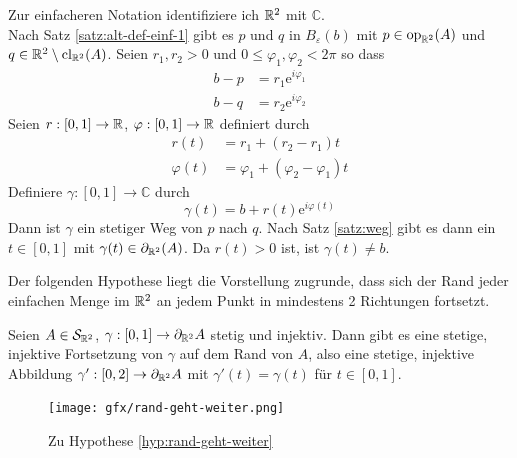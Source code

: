     \begin{bew}
        Zur einfacheren Notation identifiziere ich $\mathbb{R}^2$ mit $\mathbb{C}$.\\
        Nach Satz \ref{satz:alt-def-einf-1} gibt es $p$ und $q$ in $B_\varepsilon(b)$ mit $p \in \text{op}_{\mathbb{R}^2}(A)$ und $q \in \mathbb{R}^2 \setminus \text{cl}_{\mathbb{R}^2}(A)$. Seien $r_1, r_2 > 0$ und $0 \leq \varphi_1, \varphi_2 < 2\pi$ so dass 
        \begin{align*}
            b-p &= r_1 \text{e}^{i \varphi_1}\\
            b-q &= r_2 \text{e}^{i \varphi_2}
        \end{align*}
        Seien $r: [0,1] \to \mathbb{R}$, $\varphi: [0,1] \to \mathbb{R}$ definiert durch
        \begin{align*}
            r(t) &= r_1 + (r_2 - r_1)t\\
            \varphi(t) &= \varphi_1 + (\varphi_2 - \varphi_1)t
        \end{align*}
        Definiere $\gamma: [0,1] \to \mathbb{C}$ durch
        \[\gamma(t) = b + r(t) \text{e}^{i \varphi(t)}\]
        Dann ist $\gamma$ ein stetiger Weg von $p$ nach $q$. Nach Satz \ref{satz:weg} gibt es dann ein $t \in [0,1]$ mit $\gamma(t) \in \partial_{\mathbb{R}^2}(A)$. Da $r(t) > 0$ ist, ist $\gamma(t) \neq b$.
    \end{bew}
%     
    
    Der folgenden Hypothese liegt die Vorstellung zugrunde, dass sich der Rand jeder einfachen Menge im $\mathbb{R}^2$ an jedem Punkt in mindestens 2 Richtungen fortsetzt.
    \begin{hyp}\label{hyp:rand-geht-weiter}
        Seien $A \in \mathcal{S}_{\mathbb{R}^2}$, $\gamma : [0,1] \to \partial_{\mathbb{R}^2} A$ stetig und injektiv.
        Dann gibt es eine stetige, injektive Fortsetzung von $\gamma$ auf dem Rand von $A$, 
        also eine stetige, injektive Abbildung $\gamma' : [0,2] \to \partial_{\mathbb{R}^2} A$ mit $\gamma'(t) = \gamma(t)$ für $t \in [0,1]$.
    \end{hyp}
%     
     
     \begin{figure}[ht]
        \centering
        \texttt{[image: gfx/rand-geht-weiter.png]}
        \caption{Zu Hypothese \ref{hyp:rand-geht-weiter}}
        \label{fig:rand-geht-weiter}
    \end{figure}



